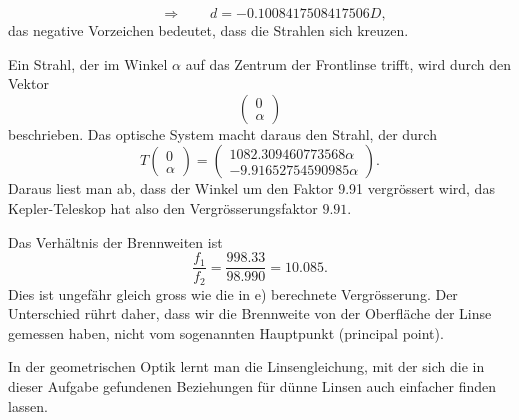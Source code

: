 \begin{loesung}
\begin{teilaufgaben}
\[\qquad\Rightarrow\qquad
d = -0.1008417508417506 D,
\]
das negative Vorzeichen bedeutet, dass die Strahlen sich kreuzen.
\item
Ein Strahl, der im Winkel $\alpha$ auf das Zentrum der Frontlinse trifft,
wird durch den Vektor
\[
\begin{pmatrix}0\\\alpha \end{pmatrix}
\]
beschrieben.
Das optische System macht daraus den Strahl, der durch
\[
T\begin{pmatrix}0\\\alpha\end{pmatrix}
=
\begin{pmatrix}
1082.309460773568 \alpha 
\\
-9.91652754590985 \alpha
\end{pmatrix}.
\]
Daraus liest man ab, dass der Winkel um den Faktor 9.91 vergrössert
wird, das Kepler-Teleskop hat also den Vergrösserungsfaktor $9.91$.
\item
Das Verhältnis der Brennweiten ist
\[
\frac{f_1}{f_2}
=
\frac{998.33}{98.990}
=
10.085.
\]
Dies ist ungefähr gleich gross wie die in e) berechnete Vergrösserung.
Der Unterschied rührt daher, dass wir die Brennweite von der Oberfläche
der Linse gemessen haben, nicht vom sogenannten Hauptpunkt
(principal point).
\qedhere
\end{teilaufgaben}
\end{loesung}

\begin{diskussion}
In der geometrischen Optik lernt man die Linsengleichung, mit der
sich die in dieser Aufgabe gefundenen Beziehungen für dünne Linsen
auch einfacher finden lassen.
\end{diskussion}
